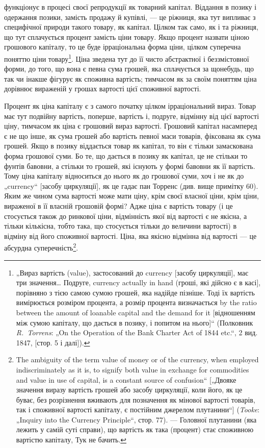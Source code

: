 \parcont{}  %
функціонує в процесі своєї репродукції як товарний капітал.
Віддання в позику і одержання позики, замість продажу й купівлі,
— це ріжниця, яка тут випливає з специфічної природи
такого товару, як капітал. Цілком так само, як і та ріжниця, що
тут сплачується процент замість ціни товару. Якщо процент
назвати ціною грошового капіталу, то це буде ірраціональна
форма ціни, цілком суперечна поняттю ціни товару\footnote{„Вираз вартість (value), застосований до currency [засобу циркуляції], має
три значення\dots{} Подруге, currency actually in hand (гроші, які дійсно є в касі],
порівняно з тією самою сумою грошей, яка надійде пізніше. Тоді їх вартість
вимірюється розміром процента, а розмір процента визначається by the ratio
between the amount of loanable capital and the demand for it [відношенням між
сумою капіталу, що дається в позику, і попитом на нього]“ (Полковник
\emph{R.~Torrens}: „On the Operation of the Bank Charter Act of 1844 etc.“, 2 вид. 1847,
[стор. 5 і далі]).}. Ціна зведена
тут до її чисто абстрактної і беззмістовної форми, до того,
що вона є певна сума грошей, яка сплачується за щонебудь, що
так чи інакше фігурує як споживна вартість; тимчасом як за
своїм поняттям ціна дорівнює вираженій у грошах вартості цієї
споживної вартості.

Процент як ціна капіталу є з самого початку цілком ірраціональний
вираз. Товар має тут подвійну вартість, поперше, вартість
і, подруге, відмінну від цієї вартості ціну, тимчасом як ціна
є грошовий вираз вартості. Грошовий капітал насамперед є не
що інше, як сума грошей або вартість певної маси товарів, фіксована
як сума грошей. Якщо в позику віддається товар як
капітал, то він є тільки замаскована форма грошової суми. Бо
те, що дається в позику як капітал, це не стільки то фунтів
бавовни, а стільки то грошей, які існують у формі бавовни як
її вартість. Тому ціна капіталу відноситься до нього як до грошової
суми, хоч і не як до „currency“ [засобу циркуляції], як
це гадає пан Торренс (див. вище примітку 60). Яким же чином
сума вартості може мати ціну, крім своєї власної ціни, крім
ціни, вираженої в її власній грошовій формі? Адже ціна є вартість
товару (і це стосується також до ринкової ціни, відмінність
якої від вартості є не якісна, а тільки кількісна, тобто така, що
стосується тільки до величини вартості) в відміну від його
споживної вартості. Ціна, яка якісно відмінна від вартості —
це абсурдна суперечність\footnote{
The ambiguity of the term value of money or of the currency, when employed
indiscriminately as it is, to signify both value in exchange for commodities
and value in use of capital, is a constant source of confusion“ [„Двояке значення
виразу вартість грошей або засобу циркуляції, коли його, як це буває, без
розрізнення вживають для позначення як мінової вартості товарів, так і споживної
вартості капіталу, є постійним джерелом плутанини“] (\emph{Tooke}: „Inquiry
into the Currency Principle“, стор. 77). — Головної плутанини (яка лежить у самій
суті справи), що вартість як така (процент) стає споживною вартістю капіталу,
Тук не бачить.
}.

